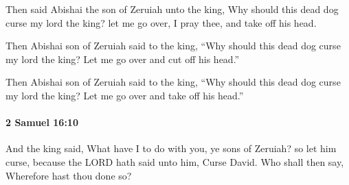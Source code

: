 			\begin{versebox}
					\item[BHS] 
					\item[ASV] Then said Abishai the son of Zeruiah unto the king, Why should this dead dog curse my lord the king? let me go over, I pray thee, and take off his head.
					\item[NIV] Then Abishai son of Zeruiah said to the king, “Why should this dead dog curse my lord the king? Let me go over and cut off his head.”
					\item[NRSV] Then Abishai son of Zeruiah said to the king, “Why should this dead dog curse my lord the king? Let me go over and take off his head.”
			\end{versebox}

		\paragraph{2 Samuel 16:10} %
			\label{2SAMUEL-16-10}

			And the king said, What have I to do with you, ye sons of Zeruiah? so let him curse, because the LORD hath said unto him, Curse David. Who shall then say, Wherefore hast thou done so?


